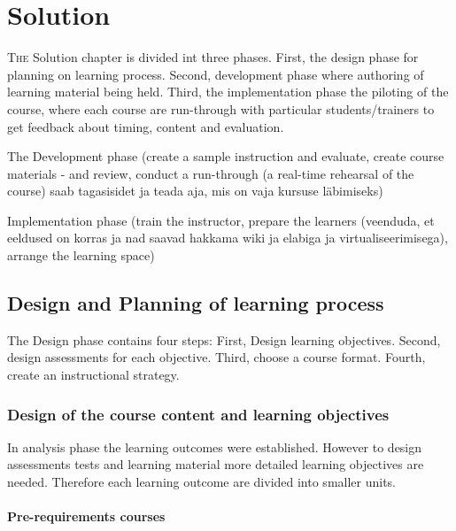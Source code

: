 \chapter{Solution}
\label{solution}
\lettrine[lraise=0.1, nindent=0em, slope=-.5em]{\color{Violet}T}{he} Solution chapter is divided int three phases. First, the design phase for planning on learning process. Second, development phase where authoring of learning material being held. Third, the implementation phase the piloting of the course, where each course are run-through with particular students/trainers to get feedback about timing, content and evaluation.




The Development phase  (create a sample instruction and evaluate, create course materials - and review, conduct a run-through (a real-time rehearsal of the course) saab tagasisidet ja teada aja, mis on vaja kursuse läbimiseks)


Implementation phase (train the instructor, prepare the learners (veenduda, et eeldused on korras ja nad saavad hakkama wiki ja elabiga ja virtualiseerimisega), arrange the learning space)

 
\section{Design and Planning of learning process}
The Design phase contains four steps: First, Design learning objectives. Second, design assessments for each objective. Third, choose a course format. Fourth, create an instructional strategy. \citep{website:design_phase_ADDIE}


\subsection{Design of the course content and learning objectives}

In analysis phase the learning outcomes were established. However to design assessments tests and learning material more detailed learning objectives are needed. Therefore each learning outcome are divided into smaller units.

\subsubsection{Pre-requirements courses}

